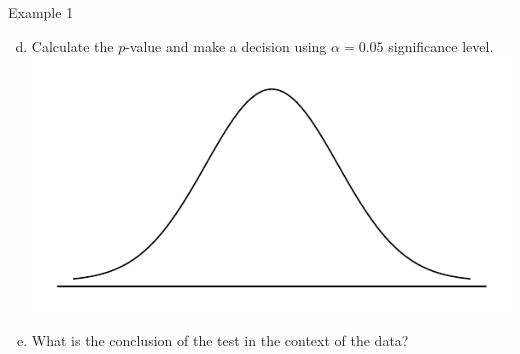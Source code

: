 \documentclass[fleqn, 10pt]{beamer}\usepackage[]{graphicx}\usepackage[]{color}
\begin{document}
\begin{frame}{Example 1}
\begin{enumerate}[(a)]
\setcounter{enumi}{3}
\item Calculate the $p$-value and make a decision using $\alpha = 0.05$ significance level.\\
\includegraphics[scale=0.35]{figure/norm_draw.pdf}
\vspace{0.75cm}

\item What is the conclusion of the test in the context of the data?
\vspace{3.25cm}
\end{enumerate}
\end{frame}
\end{document}
